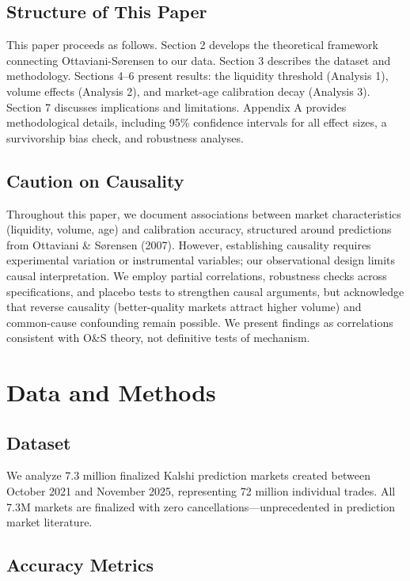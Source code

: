 \documentclass[a4paper,11pt]{article}
\theoremstyle{plain}
\theoremstyle{definition}
\begin{document}
\subsection{Structure of This Paper}

This paper proceeds as follows. Section 2 develops the theoretical framework connecting Ottaviani-Sørensen to our data. Section 3 describes the dataset and methodology. Sections 4--6 present results: the liquidity threshold (Analysis 1), volume effects (Analysis 2), and market-age calibration decay (Analysis 3). Section 7 discusses implications and limitations. Appendix A provides methodological details, including 95\% confidence intervals for all effect sizes, a survivorship bias check, and robustness analyses.

\subsection{Caution on Causality}

Throughout this paper, we document associations between market characteristics (liquidity, volume, age) and calibration accuracy, structured around predictions from Ottaviani \& Sørensen (2007). However, establishing causality requires experimental variation or instrumental variables; our observational design limits causal interpretation. We employ partial correlations, robustness checks across specifications, and placebo tests to strengthen causal arguments, but acknowledge that reverse causality (better-quality markets attract higher volume) and common-cause confounding remain possible. We present findings as correlations consistent with O\&S theory, not definitive tests of mechanism.

\section{Data and Methods}
\label{sec:methods}

\subsection{Dataset}

We analyze 7.3 million finalized Kalshi prediction markets created between October 2021 and November 2025, representing 72 million individual trades. All 7.3M markets are finalized with zero cancellations---unprecedented in prediction market literature.

\subsection{Accuracy Metrics}
\end{document}
